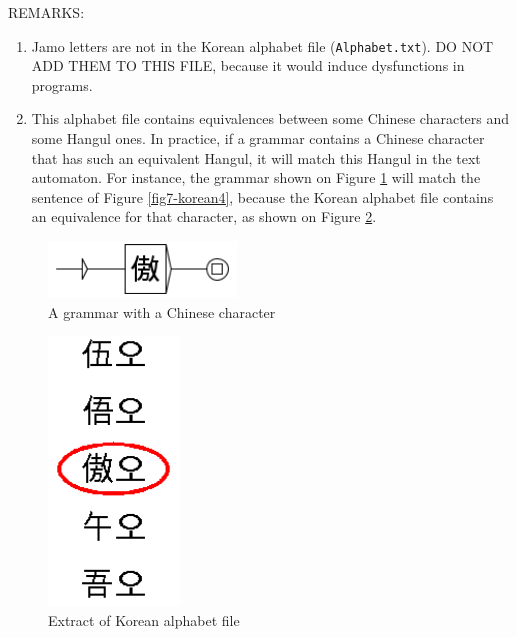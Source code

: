 \bigskip
\noindent REMARKS: 
\begin{enumerate}
    \item Jamo letters are not in the Korean alphabet file
    (\verb+Alphabet.txt+). DO NOT ADD THEM TO THIS FILE, because it
    would induce dysfunctions in programs.
    
    \item This alphabet file contains equivalences between some Chinese
    characters and some Hangul ones. In practice, if a grammar contains a
    Chinese character that has such an equivalent Hangul, it will match this
    Hangul in the text automaton. For instance, the grammar shown on Figure
    \ref{fig7-korean5} will match the sentence of Figure \ref{fig7-korean4},
    because the Korean alphabet file contains an equivalence for that
    character, as shown on Figure \ref{fig7-korean6}.
\end{enumerate}

\begin{figure}[!ht]
\begin{center}
\includegraphics[width=5cm]{resources/img/fig7-korean5.png}
\caption{A grammar with a Chinese character\label{fig7-korean5}}
\end{center}
\end{figure}

\begin{figure}[!ht]
\begin{center}
\includegraphics[width=3.5cm]{resources/img/fig7-korean6.png}
\caption{Extract of Korean alphabet file\label{fig7-korean6}}
\end{center}
\end{figure}